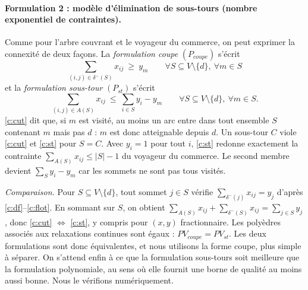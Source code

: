 \documentclass[11pt]{article}
\begin{document}
\paragraph{Formulation 2 : modèle d'élimination de sous-tours (nombre exponentiel de
contraintes).} Comme pour l'arbre couvrant et le voyageur du commerce, on
peut exprimer la connexité de deux façons. La \emph{formulation coupe} $(P_{coupe})$
s'écrit
\begin{equation}
\textstyle\sum_{(i,j)\in\delta^-(S)} x_{ij}\ \ge\ y_m
\qquad \forall S\subseteq V\setminus\{d\},\ \forall m\in S \label{c:cut}
\end{equation}
et la \emph{formulation sous-tour} $(P_{st})$ s'écrit
\begin{equation}
\textstyle\sum_{(i,j)\in A(S)} x_{ij}\ \le\ \sum_{i\in S}y_i-y_m
\qquad \forall S\subseteq V\setminus\{d\},\ \forall m\in S. \label{c:st}
\end{equation}
\eqref{c:cut} dit que, si $m$ est visité, au moins un arc entre dans tout ensemble $S$
contenant $m$ mais pas $d$ : $m$ est donc atteignable depuis $d$. Un sous-tour $C$ viole
\eqref{c:cut} et \eqref{c:st} pour $S=C$. Avec $y_i=1$ pour tout $i$, \eqref{c:st}
redonne exactement la contrainte $\sum_{A(S)}x_{ij}\le|S|-1$ du voyageur du commerce. Le second membre
devient $\sum_S y_i-y_m$ car les sommets ne sont pas tous visités.

\emph{Comparaison.} Pour $S\subseteq V\setminus\{d\}$, tout sommet $j\in S$ vérifie
$\sum_{\delta^-(j)}x_{ij}=y_j$ d'après \eqref{c:df}--\eqref{c:flot}. En sommant sur $S$,
on obtient $\sum_{A(S)}x_{ij}+\sum_{\delta^-(S)}x_{ij}=\sum_{j\in S}y_j$, donc
\eqref{c:cut} $\Leftrightarrow$ \eqref{c:st}, y compris pour $(x,y)$ fractionnaire. Les polyèdres associés aux relaxations continues sont égaux :
$PV_{coupe}=PV_{st}$. Les deux formulations sont donc équivalentes, et nous
utilisons la forme coupe, plus simple à séparer. On s'attend enfin à ce que la
formulation sous-tours soit meilleure que la formulation polynomiale, au sens où elle
fournit une borne de qualité au moins aussi bonne. Nous le vérifions numériquement.
\end{document}
